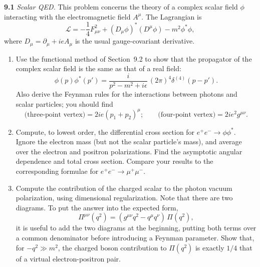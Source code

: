 \textbf{9.1} \emph{Scalar QED.}  This problem concerns the theory of a complex
scalar field $\phi$ interacting with the electromagnetic field $A^\mu$.  The
Lagrangian is
\begin{equation}
  \mathcal{L} = -\frac{1}{4}F^2_{\mu\nu} + (D_\mu\phi)^{*}(D^\mu\phi)
    - m^2\phi^{*}\phi ,
\end{equation}
where $D_\mu = \partial_\mu + ieA_\mu$ is the usual gauge-covariant
derivative.
\begin{enumerate}[label=(\alph*)]
  \item Use the functional method of Section~9.2 to show that the propagator
    of the complex scalar field is the same as that of a real field:
    \begin{equation}
      \phi(p)\phi^{*}(p') = \frac{i}{p^2-m^2+i\epsilon}\,
        (2\pi)^4\delta^{(4)}(p-p') .
    \end{equation}
    Also derive the Feynman rules for the interactions between photons and
    scalar particles; you should find
    \begin{equation}
      \text{(three-point vertex)} = 2ie(p_1+p_2)^\mu; \qquad
      \text{(four-point vertex)} = 2ie^2g^{\mu\nu} .
    \end{equation}
  \item Compute, to lowest order, the differential cross section for
    $e^{+}e^{-}\to\phi\phi^{*}$.  Ignore the electron mass (but not the scalar
    particle's mass), and average over the electron and positron
    polarizations.  Find the asymptotic angular dependence and total cross
    section.  Compare your results to the corresponding formulae for
    $e^{+}e^{-}\to\mu^{+}\mu^{-}$.
  \item Compute the contribution of the charged scalar to the photon vacuum
    polarization, using dimensional regularization.  Note that there are two
    diagrams.  To put the answer into the expected form,
    \begin{equation}
      \Pi^{\mu\nu}(q^2) = (g^{\mu\nu}q^2 - q^\mu q^\nu)\,\Pi(q^2) ,
    \end{equation}
    it is useful to add the two diagrams at the beginning, putting both terms
    over a common denominator before introducing a Feynman parameter.  Show
    that, for $-q^2 \gg m^2$, the charged boson contribution to $\Pi(q^2)$ is
    exactly $1/4$ that of a virtual electron-positron pair.
\end{enumerate}

